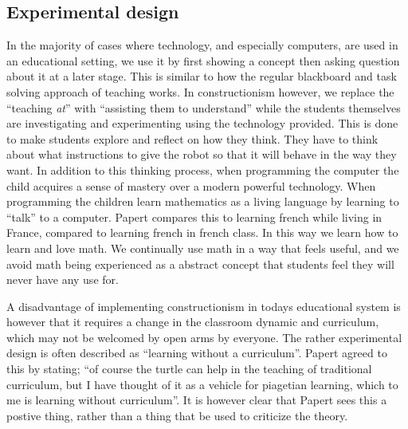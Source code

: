 \subsection*{Experimental design}
In the majority of cases where technology, and especially computers, are used in an educational setting, we use it by first showing a concept then asking question about it at a later stage. 
This is similar to how the regular blackboard and task solving approach of teaching works. 
In constructionism however, we replace the "`teaching \textit{at}"' with "`assisting them to understand"' while the students themselves are investigating and experimenting using the technology provided. 
This is done to make students explore and reflect on how they think. They have to think about what instructions to give the robot so that it will behave in the way they want. In addition to this thinking process, when programming the computer the child acquires a sense of mastery over a modern powerful technology. When programming the children learn mathematics as a living language by learning to ``talk'' to a computer. Papert compares this to learning french while living in France, compared to learning french in french class. In this way we learn how to learn and love math. We continually use math in a way that feels useful, and we avoid math being experienced as a abstract concept that students feel they will never have any use for. 

\bigskip\noindent
A disadvantage of implementing constructionism in todays educational system is however that it requires a change in the classroom dynamic and curriculum, which may not be welcomed by open arms by everyone. 
The rather experimental design is often described as ``learning without a curriculum''. Papert agreed to this by stating; ``of course the turtle can help in the teaching of traditional curriculum, but I have thought of it as a vehicle for piagetian learning, which to me is learning without curriculum''. It is however clear that Papert sees this a postive thing, rather than a thing that be used to criticize the theory. 


